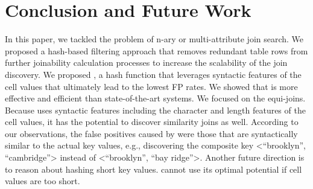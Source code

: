 \section{Conclusion and Future Work} \label{sec:conclusion}
In this paper, we tackled the problem of n-ary or multi-attribute join search. We proposed a hash-based filtering approach \system that removes redundant table rows from further joinability calculation processes to increase the scalability of the join discovery. We proposed \hash, a hash function that leverages syntactic features of the cell values that ultimately lead to the lowest FP rates. We showed that \system is more effective and efficient than state-of-the-art systems.
We focused on the equi-joins. Because \hash uses syntactic features including the character and length features of the cell values, it has the potential to discover similarity joins as well. According to our observations, the false positives caused by \hash were those that are syntactically similar to the actual key values, e.g., discovering the composite key <``brooklyn'', ``cambridge''> instead of <``brooklyn'', ``bay ridge''>. 
Another future direction is to reason about hashing short key values. \hash cannot use its optimal potential if cell values are too short.